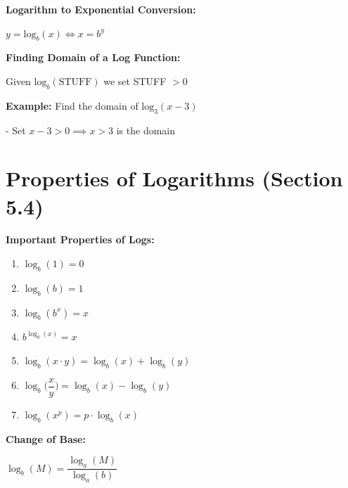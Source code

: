 \documentclass[12pt]{article}
\newenvironment{myindentpar}[1]%
     {\begin{list}{}%
             {\setlength{\leftmargin}{#1}}%
             \item[]%
     }
     {\end{list}}
\begin{document}
\vspace{1cm}

\textbf{Logarithm to Exponential Conversion:}
\newline

\centerline{$y = \text{log}_{b}(x) \Leftrightarrow x = b^{y}$}

\vspace{1cm}

\textbf{Finding Domain of a Log Function:}
\newline

\centerline{Given $\text{log}_{b}(\text{STUFF})$ we set STUFF $> 0$}


\begin{myindentpar}{1cm}
\textbf{Example:} Find the domain of $\text{log}_{3}(x-3)$

\begin{myindentpar}{2cm}
- Set $x - 3 > 0 \implies x > 3$ is the domain
\end{myindentpar}
\end{myindentpar}

\section{Properties of Logarithms (Section 5.4)}

\textbf{Important Properties of Logs:}
\begin{myindentpar}{2cm}
\begin{enumerate}
\item $\log_{b}(1) = 0$
\item $\log_{b}(b) = 1$
\item $\log_{b}(b^{x})= x$
\item $b^{\log_{b}(x)} = x$
\item $\log_{b}(x \cdot y) = \log_{b}(x) + \log_{b}(y)$ 
\item $\log_{b}\Big(\dfrac{x}{y}\Big) = \log_{b}(x) - \log_{b}(y)$
\item $\log_{b}(x^{p}) = p \cdot \log_{b}(x)$
\end{enumerate}
\end{myindentpar}

\vspace{1cm}

\textbf{Change of Base:}
\newline

\centerline{$\log_{b}(M) = \dfrac{\log_{a}(M)}{\log_{a}(b)}$}
\end{document}
